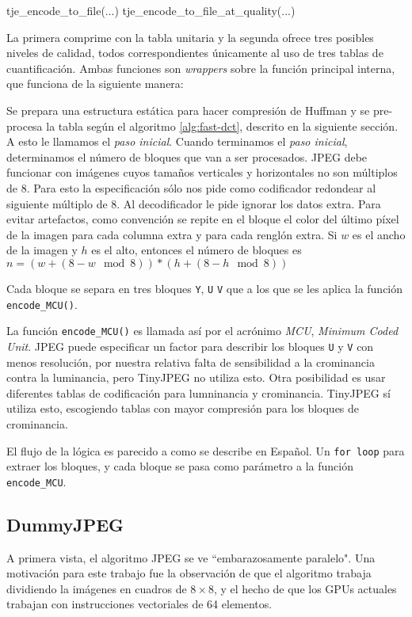 \begin{code}[language=C][h]
tje_encode_to_file(...)
tje_encode_to_file_at_quality(...)
\end{code}

La primera comprime con la tabla unitaria y la segunda ofrece tres posibles
niveles de calidad, todos correspondientes únicamente al uso de tres tablas de
cuantificación. Ambas funciones son \emph{wrappers} sobre la función principal
interna, que funciona de la siguiente manera:

Se prepara una estructura estática para hacer compresión de Huffman y se
pre-procesa la tabla según el algoritmo \ref{alg:fast-dct}, descrito en la
siguiente sección. A esto le llamamos el \emph{paso inicial}.
Cuando terminamos el \emph{paso inicial}, determinamos el número de bloques que
van a ser procesados. JPEG debe funcionar con imágenes cuyos tamaños verticales
y horizontales no son múltiplos de 8. Para esto la especificación sólo nos pide
como codificador redondear al siguiente múltiplo de 8. Al decodificador le pide
ignorar los datos extra. Para evitar artefactos, como convención se repite en
el bloque el color del último píxel de la imagen para cada columna extra y para
cada renglón extra. Si $w$ es el ancho de la imagen y $h$ es el alto, entonces
el número de bloques es
$n = (w + (8 - w \mod 8)) * (h + (8 - h \mod 8))$

Cada bloque se separa en tres bloques \verb+Y+, \verb+U+ \verb+V+ que a los que
se les aplica la función \verb+encode_MCU()+.

La función \verb+encode_MCU()+ es llamada así por el acrónimo \emph{MCU},
\emph{Minimum Coded Unit}. JPEG puede especificar un factor para describir los
bloques \verb+U+ y \verb+V+ con menos resolución, por nuestra relativa falta de
sensibilidad a la crominancia contra la luminancia, pero TinyJPEG no utiliza
esto. Otra posibilidad es usar diferentes tablas de codificación para
lumninancia y crominancia. TinyJPEG sí utiliza esto, escogiendo tablas con
mayor compresión para los bloques de crominancia.

El flujo de la lógica es parecido a como se describe en Español. Un \verb+for loop+ para extraer los bloques, y cada bloque se pasa como parámetro a la
función \verb+encode_MCU+.

\subsection{DummyJPEG} \label{sub:dummy}

A primera vista, el algoritmo JPEG se ve ``embarazosamente paralelo". Una
motivación para este trabajo fue la observación de que el algoritmo trabaja
dividiendo la imágenes en cuadros de $8\times8$, y el hecho de que los GPUs
actuales trabajan con instrucciones vectoriales de 64 elementos.

